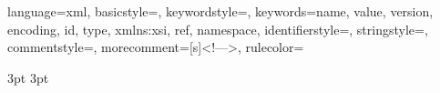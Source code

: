 {
    language=xml,
    basicstyle=\fontsize{9pt}{9pt}\selectfont\color{kommentgreen},
    keywordstyle=\color{lila},  	%
    keywords={name, value, version, encoding, id, type, xmlns:xsi, ref, namespace},
    identifierstyle=\color{black},  
    stringstyle=\color{blue},  
    commentstyle=\color{lightblue},
    morecomment=[s]{<!--}{-->},
    rulecolor=\color{black}
}
\renewcommand{\lstlistlistingname}{Quellcodeverzeichnis}
\renewcommand{\lstlistingname}{Quellcode}


\setlength{\headheight}{15pt}

\renewcommand{\chaptermark}[1]{ \markboth{#1}{} }

\fancyhf{}
\fancyhead[LE]{\thepage \ \ \ \ {\tiny \author, \today}}
\fancyhead[RO]{{\tiny \author, \today} \ \ \ \ \thepage}
\fancyhead[LO,RE]{\textit{\nouppercase{\leftmark}} }
\renewcommand{\headrulewidth}{0pt}

\graphicspath{{./figure/}}   %


\everymath{\displaystyle}    %


{3pt}                        %
{3pt}                        %
{\itshape}                   %
{}                           %
{\bfseries}                  %
{}                           %
{\newline}                   %
{}                           %
  
